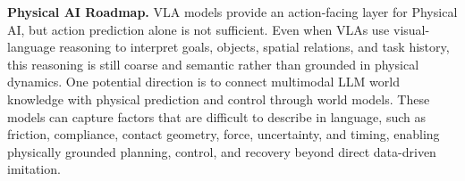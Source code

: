 \noindent\textbf{Physical AI Roadmap.}
VLA models provide an action-facing layer for Physical AI, but action prediction alone is not sufficient.
Even when VLAs use visual-language reasoning to interpret goals, objects, spatial relations, and task history, this reasoning is still coarse and semantic rather than grounded in physical dynamics.
One potential direction is to connect multimodal LLM world knowledge with physical prediction and control through world models. These models can capture factors that are difficult to describe in language, such as friction, compliance, contact geometry, force, uncertainty, and timing, enabling physically grounded planning, control, and recovery beyond direct data-driven imitation.